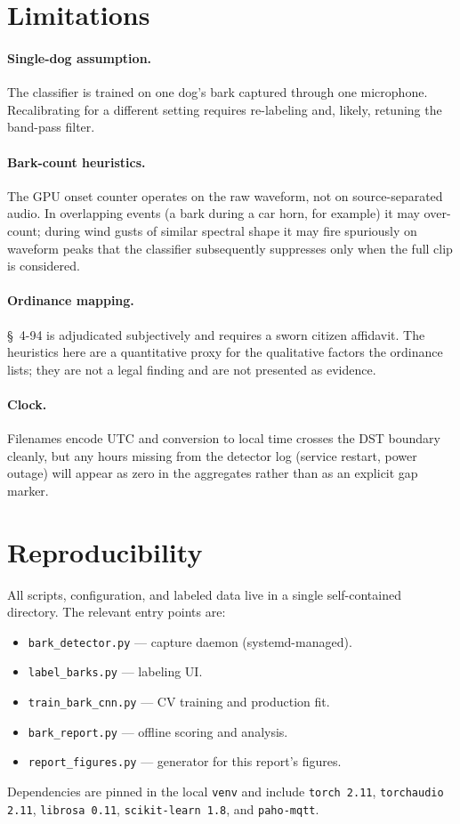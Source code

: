 \documentclass[10pt,twocolumn]{article}
\begin{document}
\section{Limitations}

\paragraph{Single-dog assumption.} The classifier is trained on one
dog's bark captured through one microphone. Recalibrating for a
different setting requires re-labeling and, likely, retuning the
band-pass filter.

\paragraph{Bark-count heuristics.} The GPU onset counter operates on
the raw waveform, not on source-separated audio. In overlapping events
(a bark during a car horn, for example) it may over-count; during
wind gusts of similar spectral shape it may fire spuriously on
waveform peaks that the classifier subsequently suppresses only when
the full clip is considered.

\paragraph{Ordinance mapping.} \S~4-94 is adjudicated subjectively and
requires a sworn citizen affidavit. The heuristics here are a
quantitative proxy for the qualitative factors the ordinance lists;
they are not a legal finding and are not presented as evidence.

\paragraph{Clock.} Filenames encode UTC and conversion to local time
crosses the DST boundary cleanly, but any hours missing from the
detector log (service restart, power outage) will appear as zero in
the aggregates rather than as an explicit gap marker.

\section{Reproducibility}
All scripts, configuration, and labeled data live in a single
self-contained directory. The relevant entry points are:
\begin{itemize}
  \item \texttt{bark\_detector.py} --- capture daemon (systemd-managed).
  \item \texttt{label\_barks.py} --- labeling UI.
  \item \texttt{train\_bark\_cnn.py} --- CV training and production fit.
  \item \texttt{bark\_report.py} --- offline scoring and analysis.
  \item \texttt{report\_figures.py} --- generator for this report's
        figures.
\end{itemize}
Dependencies are pinned in the local \texttt{venv} and include
\texttt{torch 2.11}, \texttt{torchaudio 2.11}, \texttt{librosa 0.11},
\texttt{scikit-learn 1.8}, and \texttt{paho-mqtt}.
\end{document}
